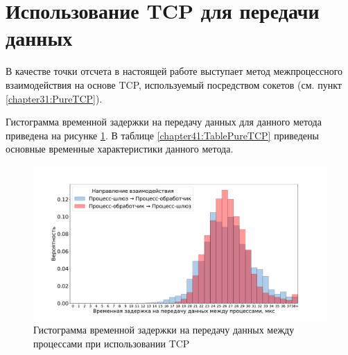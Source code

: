 \section{Использование TCP для передачи данных}

В качестве точки отсчета в настоящей работе выступает метод межпроцессного взаимодействия на основе TCP, используемый посредством сокетов (см. пункт \ref{chapter31:PureTCP}).

Гистограмма временной задержки на передачу данных для данного метода приведена на рисунке \ref{chapter41:FigPureTCP}. В таблице \ref{chapter41:TablePureTCP} приведены основные временные характеристики данного метода.

\begin{figure}[!h]
\caption{Гистограмма временной задержки на передачу данных между процессами при использовании TCP}
\label{chapter41:FigPureTCP}
\includegraphics[width=\textwidth]{../../graphics/hist/PureTCP}
\end{figure}

